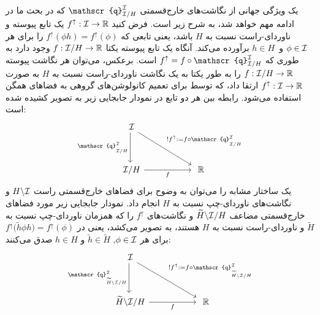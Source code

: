 یک ویژگی جهانی از نگاشت‌های خارج‌قسمتی $\mathscr{q}^{\I}_{\I/H}$ که در بحث ما در ادامه مهم خواهد شد، به شرح زیر است.
فرض کنید $f^\uparrow: \mathcal{I} \to \mathbb{R}$ یک تابع پیوسته و ناوردای-راست نسبت به $H$ باشد، یعنی تابعی که $f^\uparrow(\phi h) = f^\uparrow(\phi)$ را برای هر $\phi\in\mathcal{I}$ و~$h\in H$ برآورده می‌کند.
آنگاه یک تابع پیوسته یکتا $f: \mathcal{I}/H \to \mathbb{R}$ وجود دارد به طوری که $f^\uparrow = f \circ \mathscr{q}^{\I}_{\I/H}$ است.
برعکس، می‌توان هر نگاشت پیوسته $f: \mathcal{I}/H \to \mathbb{R}$ را به طور یکتا به یک نگاشت ناوردای-راست نسبت به $H$ به صورت $f^\uparrow: \mathcal{I} \to \mathbb{R}$ ارتقا داد، که توسط \citet{Kondor2018-GENERAL} برای تعمیم کانولوشن‌های گروهی به فضاهای همگن استفاده می‌شود.
رابطه بین هر دو تابع در نمودار جابجایی زیر به تصویر کشیده شده است:
\begin{equation}
	\label{cd:left_cosets_lift}
	\begin{tikzcd}[column sep=55pt, row sep=35pt, font=\normalsize]
		\I
		\arrow[rd, "{!f^\uparrow := f\circ \mathscr{q}^{\I}_{\overset{}{\I/H}}}"]
		\arrow[d, "{\mathscr{q}^{\I}_{\overset{}{\I/H}}}"']
		\\
		\I/H
		\arrow[r, "f"']
		& \R
	\end{tikzcd}
\end{equation}
یک ساختار مشابه را می‌توان به وضوح برای فضاهای خارج‌قسمتی راست $H\backslash\mathcal{I}$ و نگاشت‌های ناوردای-چپ نسبت به $H$ انجام داد.
نمودار جابجایی زیر مورد فضاهای خارج‌قسمتی مضاعف $\widetilde{H} \backslash \mathcal{I}/H$ و نگاشت‌های $f^\uparrow$ را که همزمان ناوردای-چپ نسبت به $\widetilde{H}$ و ناوردای-راست نسبت به $H$ هستند، به تصویر می‌کشد، یعنی در ${f^\uparrow\big(\widetilde{h}\phi h\big) = f^\uparrow(\phi)}$ برای هر ${\phi\in\mathcal{I}}$, ${\widetilde{h}\in\widetilde{H}}$ و ${h\in H}$ صدق می‌کنند:
\begin{equation}
	\label{cd:double_cosets_lift}
	\begin{tikzcd}[column sep=55pt, row sep=35pt, font=\normalsize]
		\I
		\arrow[rd, "{!f^\uparrow := f\circ \mathscr{q}^{\I}_{\overset{}{\widetilde{H} \backslash \I/H}}}"]
		\arrow[d, "{\mathscr{q}^{\I}_{\overset{}{\widetilde{H} \backslash \I/H}}}"']
		\\
		\widetilde{H} \backslash \I/H
		\arrow[r, "f"']
		& \R
	\end{tikzcd}
\end{equation}





